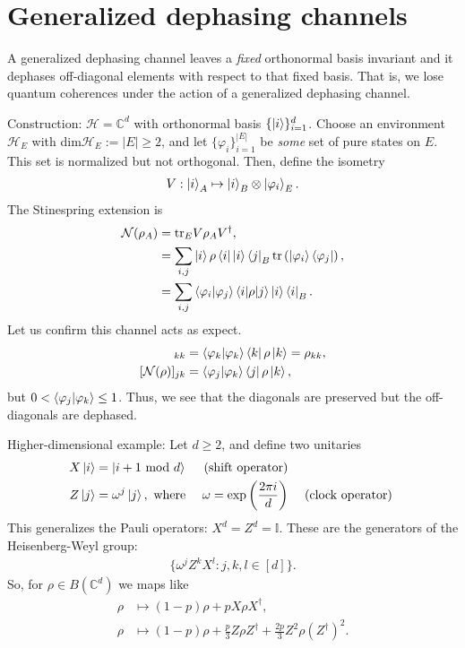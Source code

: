 \documentclass[10pt,oneside,longbibliography]{report}
\begin{document}
\section{Generalized dephasing channels}
A generalized dephasing channel leaves a \textit{fixed} orthonormal basis invariant and it dephases off-diagonal elements with respect to that fixed basis. That is, we lose quantum coherences under the action of a generalized dephasing channel. 

Construction: $\mathcal{H}=\mathbb{C}^d$ with orthonormal basis $\{\ket{i}\}_{i=1}^d$. Choose an environment $\mathcal{H}_E$ with dim$\mathcal{H}_E :=|E| \geq 2$, and let $\{\varphi_i\}_{i=1}^{|E|}$ be \textit{some} set of pure states on $E$. This set is normalized but not orthogonal. Then, define the isometry
\begin{align}
   V: \ket{i}_A \mapsto \ket{i}_B \otimes \ket{\varphi_i}_E.
\end{align}
The Stinespring extension is
\begin{align}
    \mathcal{N}(\rho_A) &= \text{tr}_E V \rho_A V^{\dagger}, \\
    &= \sum_{i,j} \ket{i}\rho \bra{i} \ket{i}\bra{j}_B \text{tr}\left(\ket{\varphi_i}\bra{\varphi_j}\right),\\
    &=\sum_{i,j} \braket{\varphi_i|\varphi_j} \braket{i|\rho|j} \ket{i}\bra{i}_B.
\end{align}
Let us confirm this channel acts as expect. 
\begin{align}
    [\mathcal{N}(\rho)]_{kk} &= \braket{\varphi_k|\varphi_k} \bra{k}\rho \ket{k} = \rho_{kk}, \\
    [\mathcal{N}(\rho)]_{jk} &=\braket{\varphi_j|\varphi_k} \bra{j}\rho \ket{k},
\end{align}
but $0 < \braket{\varphi_j|\varphi_k} \leq 1$. Thus, we see that the diagonals are preserved but the off-diagonals are dephased. 

Higher-dimensional example: Let $d\geq 2$, and define two unitaries 
\begin{align}
    X\ket{i} &= \ket{i+1 \text{ mod } d} \quad \text{ (shift operator) } \\
    Z\ket{j} &= \omega^j \ket{j}, \text{ where } \quad \omega=\exp{\left(\frac{2 \pi i}{d}\right)} \quad \text{ (clock operator) }
\end{align}
This generalizes the Pauli operators: $X^d=Z^d = \mathbb{I}$. These are the generators of the Heisenberg-Weyl group:
\begin{align}
    \{\omega^j Z^k X^l : j,k,l \in [d]\}.
\end{align}
So, for $\rho \in B(\mathbb{C}^d)$ we maps like 
\begin{align}
    \rho &\mapsto (1-p)\rho + p X\rho X^{\dagger}, \\
    \rho &\mapsto (1-p)\rho +\frac{p}{3} Z\rho Z^{\dagger} + \frac{2p}{3} Z^2 \rho (Z^{\dagger})^2.
\end{align}

{}

\end{document}
